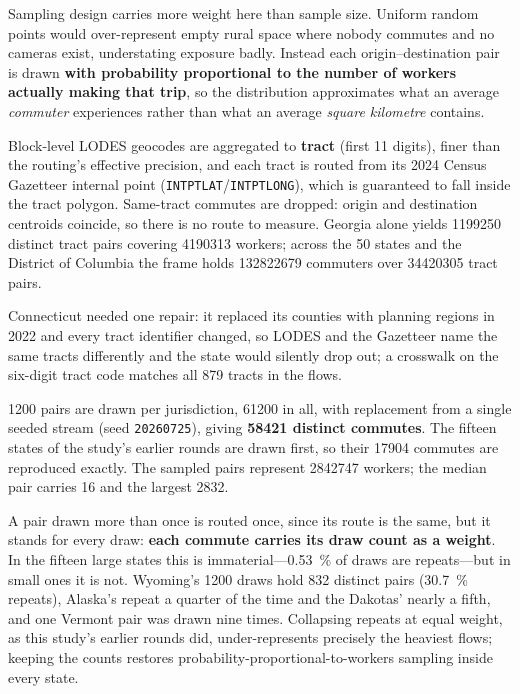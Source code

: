\documentclass[11pt,twoside]{article}
\begin{document}
Sampling design carries more weight here than sample size. Uniform random points would
over-represent empty rural space where nobody commutes and no cameras exist, understating
exposure badly. Instead each origin--destination pair is drawn \textbf{with probability
proportional to the number of workers actually making that trip}, so the distribution
approximates what an average \emph{commuter} experiences rather than what an average
\emph{square kilometre} contains.

Block-level LODES geocodes are aggregated to \textbf{tract} (first 11 digits), finer than the
routing's effective precision, and each tract is routed from its 2024 Census Gazetteer internal
point \citep{gazetteer2024} (\texttt{INTPTLAT}/\texttt{INTPTLONG}), which is guaranteed to fall
inside the tract polygon. Same-tract commutes are dropped: origin and destination centroids
coincide, so there is no route to measure. Georgia alone yields \num{1199250} distinct tract pairs
covering \num{4190313} workers; across the 50 states and the District of Columbia the frame
holds \num{132822679} commuters over \num{34420305} tract pairs.

Connecticut needed one repair: it replaced its counties with planning regions in 2022 and every
tract identifier changed, so LODES and the Gazetteer name the same tracts differently and the
state would silently drop out; a crosswalk on the six-digit tract code matches all 879 tracts
in the flows.

\num{1200} pairs are drawn per jurisdiction, \num{61200} in all, with replacement from a
single seeded stream (seed \texttt{20260725}), giving \textbf{\num{58421} distinct commutes}.
The fifteen states of the study's earlier rounds are drawn first, so their \num{17904}
commutes are reproduced exactly. The sampled pairs represent
\num{2842747} workers; the median pair carries 16 and the largest \num{2832}.

A pair drawn more than once is routed once, since its route is the same, but it stands for
every draw: \textbf{each commute carries its draw count as a weight}. In the fifteen large
states this is immaterial---\SI{0.53}{\percent} of draws are repeats---but in small ones it
is not. Wyoming's \num{1200} draws hold 832 distinct pairs (\SI{30.7}{\percent} repeats),
Alaska's repeat a quarter of the time and the Dakotas' nearly a fifth, and one Vermont pair was
drawn nine times. Collapsing repeats at equal weight, as this study's earlier rounds did,
under-represents precisely the heaviest flows; keeping the counts restores
probability-proportional-to-workers sampling inside every state.
\end{document}
